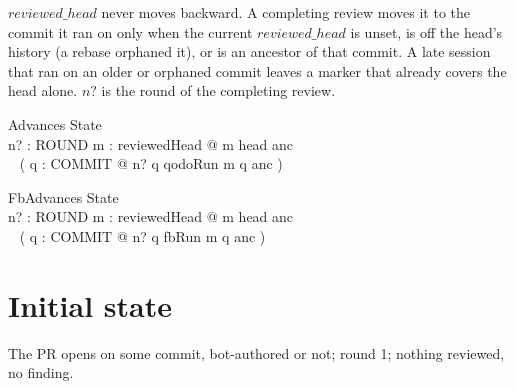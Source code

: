 \documentclass{article}
\begin{document}
$reviewed\_head$ never moves backward. A completing review moves it to the
commit it ran on only when the current $reviewed\_head$ is unset, is off the
head's history (a rebase orphaned it), or is an ancestor of that commit. A
late session that ran on an older or orphaned commit leaves a marker that
already covers the head alone. $n?$ is the round of the completing review.

\begin{schema}{Advances}
  State \\
  n? : ROUND
\where
  \forall m : reviewedHead @ m \mapsto head \in anc \implies \\
  \quad~ ( \exists q : COMMIT @ n? \mapsto q \in qodoRun \land m \mapsto q \in anc )
\end{schema}

\begin{schema}{FbAdvances}
  State \\
  n? : ROUND
\where
  \forall m : reviewedHead @ m \mapsto head \in anc \implies \\
  \quad~ ( \exists q : COMMIT @ n? \mapsto q \in fbRun \land m \mapsto q \in anc )
\end{schema}

\section{Initial state}

The PR opens on some commit, bot-authored or not; round 1; nothing reviewed,
no finding.
\end{document}
